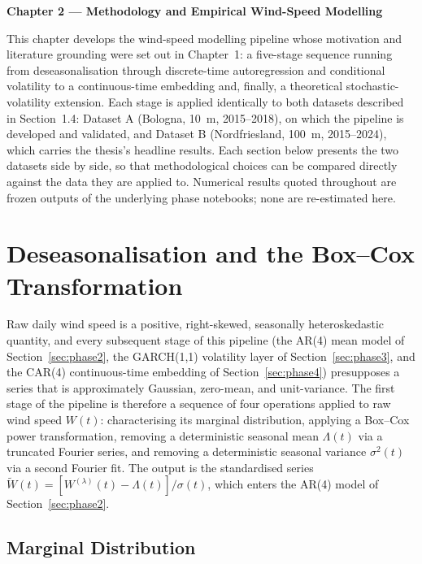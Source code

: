 \documentclass[11pt, a4paper, twoside]{article}
\begin{document}
\newpage
\begin{center}
{\LARGE\textbf{Chapter 2 --- Methodology and Empirical Wind-Speed Modelling}}
\end{center}
\vspace{\baselineskip}
\setcounter{section}{0}
\renewcommand{\thesection}{2.\arabic{section}}
This chapter develops the wind-speed modelling pipeline whose motivation and literature grounding were set out in Chapter~1: a five-stage sequence running from deseasonalisation through discrete-time autoregression and conditional volatility to a continuous-time embedding and, finally, a theoretical stochastic-volatility extension. Each stage is applied identically to both datasets described in Section~1.4: Dataset A (Bologna, 10~m, 2015--2018), on which the pipeline is developed and validated, and Dataset B (Nordfriesland, 100~m, 2015--2024), which carries the thesis's headline results. Each section below presents the two datasets side by side, so that methodological choices can be compared directly against the data they are applied to. Numerical results quoted throughout are frozen outputs of the underlying phase notebooks; none are re-estimated here.

\section{Deseasonalisation and the Box--Cox Transformation}
\label{sec:phase1}

Raw daily wind speed is a positive, right-skewed, seasonally heteroskedastic quantity, and every subsequent stage of this pipeline (the AR(4) mean model of Section~\ref{sec:phase2}, the GARCH(1,1) volatility layer of Section~\ref{sec:phase3}, and the CAR(4) continuous-time embedding of Section~\ref{sec:phase4}) presupposes a series that is approximately Gaussian, zero-mean, and unit-variance. The first stage of the pipeline is therefore a sequence of four operations applied to raw wind speed $W(t)$: characterising its marginal distribution, applying a Box--Cox power transformation, removing a deterministic seasonal mean $\Lambda(t)$ via a truncated Fourier series, and removing a deterministic seasonal variance $\sigma^2(t)$ via a second Fourier fit. The output is the standardised series $\widetilde W(t) = [W^{(\lambda)}(t) - \Lambda(t)]/\sigma(t)$, which enters the AR(4) model of Section~\ref{sec:phase2}.

\subsection{Marginal Distribution}
\label{sec:phase1-marginal}
\end{document}

